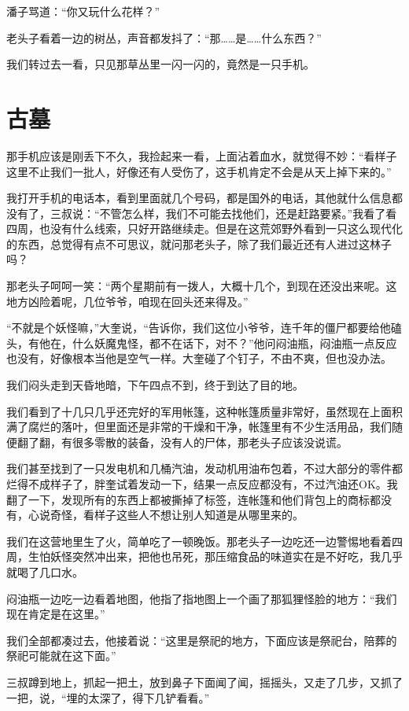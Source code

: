 潘子骂道：“你又玩什么花样？”

老头子看着一边的树丛，声音都发抖了：“那……是……什么东西？”

我们转过去一看，只见那草丛里一闪一闪的，竟然是一只手机。

\chapter{古墓}

那手机应该是刚丢下不久，我捡起来一看，上面沾着血水，就觉得不妙：“看样子这里不止我们一批人，好像还有人受伤了，这手机肯定不会是从天上掉下来的。”

我打开手机的电话本，看到里面就几个号码，都是国外的电话，其他就什么信息都没有了，三叔说：“不管怎么样，我们不可能去找他们，还是赶路要紧。”我看了看四周，也没有什么线索，只好开路继续走。但是在这荒郊野外看到一只这么现代化的东西，总觉得有点不可思议，就问那老头子，除了我们最近还有人进过这林子吗？

那老头子呵呵一笑：“两个星期前有一拨人，大概十几个，到现在还没出来呢。这地方凶险着呢，几位爷爷，咱现在回头还来得及。”

“不就是个妖怪嘛，”大奎说，“告诉你，我们这位小爷爷，连千年的僵尸都要给他磕头，有他在，什么妖魔鬼怪，都不在话下，对不？”他问闷油瓶，闷油瓶一点反应也没有，好像根本当他是空气一样。大奎碰了个钉子，不由不爽，但也没办法。

我们闷头走到天昏地暗，下午四点不到，终于到达了目的地。

我们看到了十几只几乎还完好的军用帐篷，这种帐篷质量非常好，虽然现在上面积满了腐烂的落叶，但里面还是非常的干燥和干净，帐篷里有不少生活用品，我们随便翻了翻，有很多零散的装备，没有人的尸体，那老头子应该没说谎。

我们甚至找到了一只发电机和几桶汽油，发动机用油布包着，不过大部分的零件都烂得不成样子了，胖奎试着发动一下，结果一点反应都没有，不过汽油还OK。我翻了一下，发现所有的东西上都被撕掉了标签，连帐篷和他们背包上的商标都没有，心说奇怪，看样子这些人不想让别人知道是从哪里来的。

我们在这营地里生了火，简单吃了一顿晚饭。那老头子一边吃还一边警惕地看着四周，生怕妖怪突然冲出来，把他也吊死，那压缩食品的味道实在是不好吃，我几乎就喝了几口水。

闷油瓶一边吃一边看着地图，他指了指地图上一个画了那狐狸怪脸的地方：“我们现在肯定是在这里。”

我们全部都凑过去，他接着说：“这里是祭祀的地方，下面应该是祭祀台，陪葬的祭祀可能就在这下面。”

三叔蹲到地上，抓起一把土，放到鼻子下面闻了闻，摇摇头，又走了几步，又抓了一把，说，“埋的太深了，得下几铲看看。”

